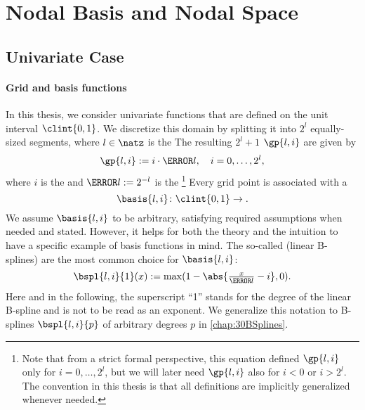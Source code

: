\section{Nodal Basis and Nodal Space}
\label{sec:21nodalSpaces}


\mbox{}\vspace{-14mm}



\disableornamentsfornextheadingtrue
\subsection{Univariate Case}
\label{sec:211nodalUV}

\paragraph{Grid and basis functions}

In this thesis, we consider univariate functions
that are defined on the unit interval $\clint{0, 1}$.
We discretize this domain by splitting it into $2^l$ equally-sized segments,
where $l \in \natz$ is the 
The resulting $2^l + 1$  $\gp{l,i}$ are given by
\begin{equation}
  \gp{l,i} := i \cdot \ms{l},\quad
  i = 0, \dotsc, 2^l,
\end{equation}
where $i$ is the  and $\ms{l} := 2^{-l}$ is the %
\footnote{%
  Note that from a strict formal perspective,
  this equation defined $\gp{l,i}$ only for $i = 0, \dotsc, 2^l$,
  but we will later need $\gp{l,i}$ also for $i < 0$ or $i > 2^l$.
  The convention in this thesis is that all definitions are
  implicitly generalized whenever needed.%
}
Every grid point is associated with a 
\begin{equation}
  \basis{l,i}\colon \clint{0, 1} \to \real.
\end{equation}
We assume $\basis{l,i}$ to be arbitrary,
satisfying required assumptions when needed and stated.
However, it helps for both the theory and the intuition to have a
specific example of basis functions in mind.
The so-called  (linear B-splines)
are the most common choice for $\basis{l,i}$:
\begin{equation}
  \label{eq:hatFunctionUV}
  \bspl{l,i}{1}(x)
  := \max(1 - \abs{\tfrac{x}{\ms{l}} - i}, 0).
\end{equation}
Here and in the following,
the superscript ``1'' stands for the degree of the linear B-spline and
is not to be read as an exponent.
We generalize this notation to B-splines $\bspl{l,i}{p}$ of
arbitrary degrees $p$ in \cref{chap:30BSplines}.

